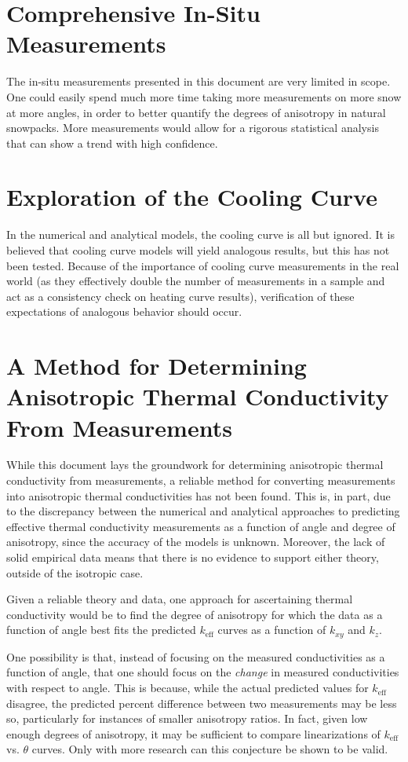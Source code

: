 \section{Comprehensive In-Situ Measurements}

The in-situ measurements presented in this document are very limited in scope.
One could easily spend much more time taking more measurements on more snow at
more angles, in order to better quantify the degrees of anisotropy in natural
snowpacks. More measurements would allow for a rigorous statistical analysis that
can show a trend with high confidence.


\section{Exploration of the Cooling Curve}

In the numerical and analytical models, the cooling curve is all but ignored. It
is believed that cooling curve models will yield analogous results, but this has
not been tested. Because of the importance of cooling curve measurements in the
real world (as they effectively double the number of measurements in a sample
and act as a consistency check on heating curve results),
verification of these expectations of analogous behavior should occur.

\section{A Method for Determining Anisotropic Thermal Conductivity From Measurements}

While this document lays the groundwork for determining anisotropic thermal
conductivity from measurements, a reliable method for converting measurements
into anisotropic thermal conductivities has not been found. This is, in part,
due to the discrepancy between the numerical and analytical approaches to
predicting effective thermal conductivity measurements as a function of angle
and degree of anisotropy, since the accuracy of the models is unknown.
Moreover, the lack of solid empirical data means that there is no evidence to
support either theory, outside of the isotropic case.

Given a reliable theory and data, one approach for ascertaining thermal
conductivity would be to find the degree of anisotropy for which the data as a
function of angle best fits the predicted \(k_{\textrm{eff}}\) curves
as a function of \(k_{xy}\) and \(k_z\).

One possibility is that, instead of focusing on the measured conductivities as a
function of angle, that one should focus on the \emph{change} in measured
conductivities with respect to angle. This is because, while the actual predicted
values for \(k_{\textrm{eff}}\) disagree, the predicted percent difference
between two measurements may be less so, particularly for instances of smaller
anisotropy ratios. In fact, given low enough degrees of
anisotropy, it may be sufficient to compare linearizations of
\(k_{\textrm{eff}}\) vs. \(\theta\) curves. Only with more research can this
conjecture be shown to be valid.

